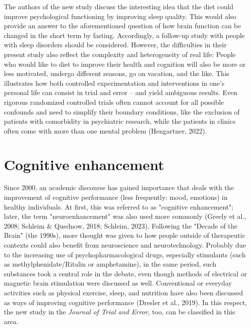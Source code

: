 \documentclass[authordate, empirical]{jote-new-article}
\begin{document}
The authors of the new study discuss the interesting idea that the diet could improve psychological functioning by improving sleep quality. This would also provide an answer to the aforementioned question of how brain function can be changed in the short term by fasting. Accordingly, a follow-up study with people with sleep disorders should be considered. However, the difficulties in their present study also reflect the complexity and heterogeneity of real life: People who would like to diet to improve their health and cognition will also be more or less motivated, undergo different seasons, go on vacation, and the like. This illustrates how both controlled experimentation and interventions in one's personal life can consist in trial and error -- and yield ambiguous results. Even rigorous randomized controlled trials often cannot account for all possible confounds and need to simplify their boundary conditions, like the exclusion of patients with comorbidity in psychiatric research, while the patients in clinics often come with more than one mental problem (Hengartner, 2022).







\section{\textbf{Cognitive enhancement}}







Since 2000, an academic discourse has gained importance that deals with the improvement of cognitive performance (less frequently: mood, emotions) in healthy individuals. At first, this was referred to as "cognitive enhancement"; later, the term "neuroenhancement" was also used more commonly (Greely et al., 2008; Schleim \& Quednow, 2018; Schleim, 2023). Following the "Decade of the Brain" (the 1990s), more thought was given to how people outside of therapeutic contexts could also benefit from neuroscience and neurotechnology. Probably due to the increasing use of psychopharmacological drugs, especially stimulants (such as methylphenidate/Ritalin or amphetamine), in the same period, such substances took a central role in the debate, even though methods of electrical or magnetic brain stimulation were discussed as well. Conventional or everyday activities such as physical exercise, sleep, and nutrition have also been discussed as ways of improving cognitive performance (Dresler et al., 2019). In this respect, the new study in the \emph{Journal of Trial and Error, }too, can be classified in this area.
\end{document}
